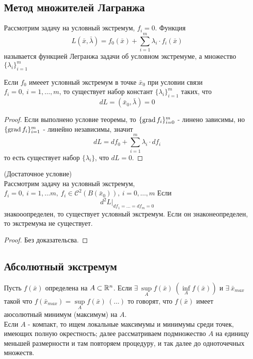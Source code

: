 \subsection{Метод множителей Лагранжа}
\begin{definition}
    Рассмотрим задачу на условный экстремум, $f_i=0$. Функция 
    \[L(\bar{x},\bar{\lambda})=f_0(\bar{x})+\sum\limits_{i=1}^{m}\lambda_i\cdot f_i(\bar{x})\]
    называется функцией Легранжа задачи об условном экстремуме, а множество $\{\lambda_i\}_{i=1}^m$
\end{definition} 
\begin{theorem}
    Если $f_0$ имееет условный экстремум в точке $\bar{x}_0$ при условии связи $f_i=0,\ i=1,\dots,m$, то существует набор констант $\{\lambda_i\}_{i=1}^m$ таких, что 
    \[dL=(\bar{x}_0,\bar{\lambda})=0\]
\end{theorem} 
\begin{proof}
    Если выполнено условие теоремы, то $\{\operatorname*{grad} f_i\}_{i=0}^m$ - линено зависимы, но $\{\operatorname*{grad} f_i\}_{i=1}^m$ - линейно независимы, значит
    \[dL=df_0+\sum\limits_{i=1}^{m}\lambda_i\cdot df_i\]
    то есть существует набор $\{\lambda_i\}$, что $dL=0$. 
\end{proof} 
\begin{theorem} (Достаточное условие)\\
    Рассмотрим задачу на условный экстремум, $f_i=0,\ i=1,\dots m,\ f_i\in \mathcal{C}^2(B(\bar{x}_0)),\ i=0,\dots,m$ Если
    \[d^2L|_{df_1=\dots=df_m=0}\]
    знакооопределен, то существует условный экстремум. Если он знаконеопределен, то экстремума не существует.
\end{theorem} 
\begin{proof}
    Без доказательсва.
\end{proof} 
\subsection{Абсолютный экстремум}
\begin{definition}
    Пусть $f(\bar{x})$ определена на $A\subset \mathbb{R}^n$. Если $\exists\ \sup\limits_A f(\bar{x})\ (\inf\limits_A f(\bar{x}))$ и $\exists\ \bar{x}_{max}$ такой что $f(\bar{x}_{max})=\sup\limits_A f(\bar{x})\ (\dots)$ то говорят, что $f(\bar{x})$ имеет аюсолютный минимум (максимум) на $A$.
    \\ Если $A$ - компакт, то ищем локальные максимумы и минимумы среди точек, имеющих полную окрестность; далее рассматриваем подмножество $A$ на единицу меньшей размерности и там повторяем процедуру, и так далее до одноточечных множеств.
\end{definition} 

